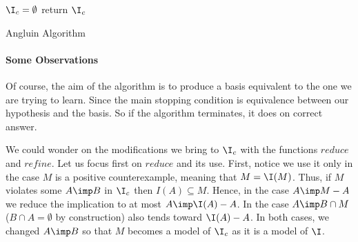 \begin{algorithm}
\KwIn{$\I$}

\BlankLine

$\I_c = \emptyset$ \;
return $\I_c$ \;
	
\caption{Angluin Algorithm}
\label{alg:Angluin}
\end{algorithm}

\paragraph{Some Observations} Of course, the aim of the algorithm is to produce 
a basis equivalent to the one we are trying to learn. Since the main stopping 
condition is equivalence between our hypothesis and the basis. So if the 
algorithm terminates, it does on correct answer. 

\vspace{1.2em} 

We could wonder on the modifications we bring to $\I_c$ with the
functions $reduce$ and $refine$. Let us focus first on $reduce$ and its use.
First, notice we use it only in the case $M$ is a positive counterexample, 
meaning that $M = \I(M)$. Thus, if $M$ violates some $A \imp B$ in $\I_c$ then
$I(A) \subseteq M$. Hence, in the case $A \imp M - A$ we reduce the implication
to at most $A \imp \I(A) - A$. In the case $A \imp B \cap M$ ($B \cap A = 
\emptyset$ by construction) also tends toward $\I(A) - A$. In both cases, we 
changed $A \imp B$ so that $M$ becomes a model of $\I_c$ as it is a model of
$\I$.

\vspace{1.2em}




